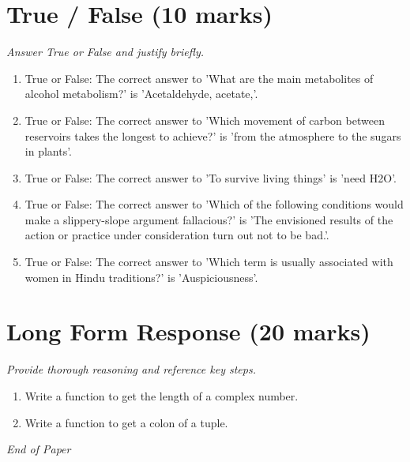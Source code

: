\documentclass[12pt]{article}
\begin{document}
\section*{True / False (10 marks)}
\textit{Answer True or False and justify briefly.}
\begin{enumerate}[label=\arabic*.]
\item True or False: The correct answer to 'What are the main metabolites of alcohol metabolism?' is 'Acetaldehyde, acetate,'.
\item True or False: The correct answer to 'Which movement of carbon between reservoirs takes the longest to achieve?' is 'from the atmosphere to the sugars in plants'.
\item True or False: The correct answer to 'To survive living things' is 'need H2O'.
\item True or False: The correct answer to 'Which of the following conditions would make a slippery-slope argument fallacious?' is 'The envisioned results of the action or practice under consideration turn out not to be bad.'.
\item True or False: The correct answer to 'Which term is usually associated with women in Hindu traditions?' is 'Auspiciousness'.
\end{enumerate}

\section*{Long Form Response (20 marks)}
\textit{Provide thorough reasoning and reference key steps.}
\begin{enumerate}[label=\arabic*.]
\item Write a function to get the length of a complex number.
\item Write a function to get a colon of a tuple.
\end{enumerate}

\vfill
\noindent\textit{End of Paper}
\end{document}
